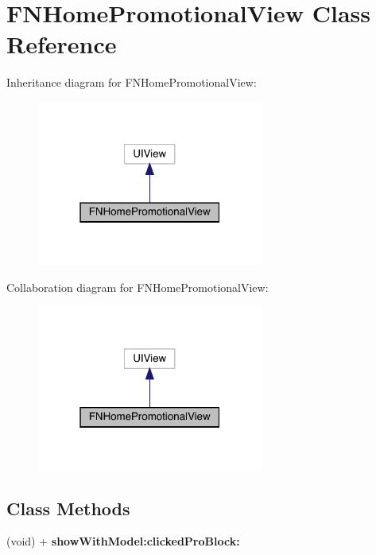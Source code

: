 \hypertarget{interface_f_n_home_promotional_view}{}\section{F\+N\+Home\+Promotional\+View Class Reference}
\label{interface_f_n_home_promotional_view}


Inheritance diagram for F\+N\+Home\+Promotional\+View\+:\nopagebreak
\begin{figure}[H]
\begin{center}
\leavevmode
\includegraphics[width=211pt]{interface_f_n_home_promotional_view__inherit__graph}
\end{center}
\end{figure}


Collaboration diagram for F\+N\+Home\+Promotional\+View\+:\nopagebreak
\begin{figure}[H]
\begin{center}
\leavevmode
\includegraphics[width=211pt]{interface_f_n_home_promotional_view__coll__graph}
\end{center}
\end{figure}
\subsection*{Class Methods}
\begin{DoxyCompactItemize}
\item 
\mbox{\label{interface_f_n_home_promotional_view_a86daaaaad5b3f9ce5eab736983bea6e2}} 
(void) + {\bfseries show\+With\+Model\+:clicked\+Pro\+Block\+:}
\end{DoxyCompactItemize}
